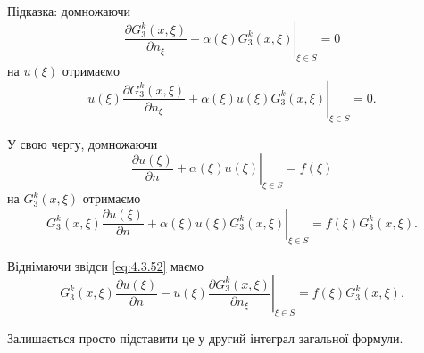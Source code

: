 \begin{remark}
	Підказка: домножаючи 
	\begin{equation}
		\left. \frac{\partial G_3^k(x, \xi)}{\partial n_\xi} + \alpha(\xi) G_3^k(x, \xi) \right|_{\xi \in S} = 0
	\end{equation}
	на $u(\xi)$ отримаємо
	\begin{equation}
		\label{eq:4.3.52}
		\left. u(\xi) \frac{\partial G_3^k(x, \xi)}{\partial n_\xi} + \alpha(\xi) u(\xi) G_3^k(x, \xi) \right|_{\xi \in S} = 0.
	\end{equation}

	У свою чергу, домножаючи
	\begin{equation}
		\left. \frac{\partial u(\xi)}{\partial n} + \alpha(\xi) u(\xi) \right|_{\xi \in S} = f(\xi)
	\end{equation}
	на $G_3^k(x, \xi)$ отримаємо
	\begin{equation}
		\left. G_3^k(x, \xi) \frac{\partial u(\xi)}{\partial n} + \alpha(\xi) u(\xi) G_3^k(x, \xi) \right|_{\xi \in S} = f(\xi) G_3^k(x, \xi).
	\end{equation}

	Віднімаючи звідси \eqref{eq:4.3.52} маємо
	\begin{equation}
		\left. G_3^k(x, \xi) \frac{\partial u(\xi)}{\partial n} - u(\xi) \frac{\partial G_3^k(x, \xi)}{\partial n_\xi} \right|_{\xi \in S} = f(\xi) G_3^k(x, \xi).
	\end{equation}

	Залишається просто підставити це у другий інтеграл загальної формули.
\end{remark}